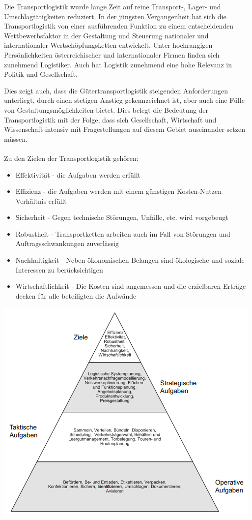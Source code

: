 \documentclass[a4paper,12pt]{scrreprt}
\begin{document}
	Die Transportlogistik wurde lange Zeit auf reine Transport-, Lager- und Umschlagtätigkeiten reduziert. In der jüngsten Vergangenheit hat sich die Transportlogistik von einer ausführenden Funktion zu einem entscheidenden Wettbewerbsfaktor in der Gestaltung und Steuerung nationaler und internationaler Wertschöpfungsketten entwickelt. Unter hochrangigen Persönlichkeiten österreichischer und internationaler Firmen finden sich zunehmend Logistiker. Auch hat Logistik zunehmend eine hohe Relevanz in Politik und Gesellschaft.
	
	Dies zeigt auch, dass die Gütertransportlogistik steigenden
	Anforderungen unterliegt, durch einen stetigen Anstieg gekennzeichnet ist, aber auch eine Fülle von Gestaltungsmöglichkeiten bietet. Dies belegt die Bedeutung der Transportlogistik mit der Folge, dass sich Gesellschaft, Wirtschaft und Wissenschaft intensiv mit Fragestellungen auf diesem Gebiet auseinander setzen müssen.\\\\
	Zu den Zielen der Transportlogistik gehören:
	\begin{itemize}
	\item Effektivität - die Aufgaben werden erfüllt
	\item Effizienz - die Aufgaben werden mit einem günstigen Kosten-Nutzen Verhältnis erfüllt
	\item Sicherheit - Gegen technische Störungen, Unfälle, etc. wird vorgebeugt
	\item Robustheit - Transportketten arbeiten auch im Fall von Störungen und Auftragsschwankungen zuverlässig
	\item Nachhaltigkeit - Neben ökonomischen Belangen sind ökologische und soziale Interessen zu berücksichtigen
	\item Wirtschaftlichkeit - Die Kosten sind angemessen und die erzielbaren Erträge decken für alle beteiligten die Aufwände
	\end{itemize}
	
	\begin{center}

\includegraphics[width=1\linewidth]{./Bilder/Ziele_Transportlogistik}
\end{center}
\end{document}
